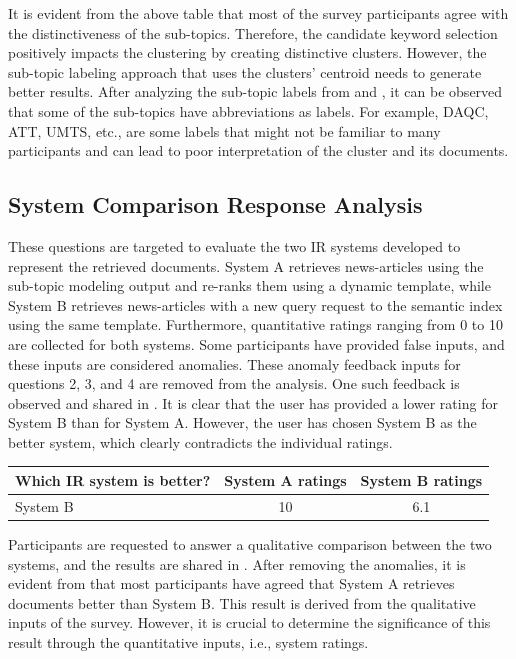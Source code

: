 It is evident from the above table that most of the survey participants agree with the distinctiveness of the sub-topics. Therefore, the candidate keyword selection positively impacts the clustering by creating distinctive clusters. However, the sub-topic labeling approach that uses the clusters' centroid needs to generate better results. After analyzing the sub-topic labels from  and , it can be observed that some of the sub-topics have abbreviations as labels. For example, DAQC, ATT, UMTS, etc., are some labels that might not be familiar to many participants and can lead to poor interpretation of the cluster and its documents.

\subsection{System Comparison Response Analysis}

These questions are targeted to evaluate the two IR systems developed to represent the retrieved documents. System A retrieves news-articles using the sub-topic modeling output and re-ranks them using a dynamic template, while System B retrieves news-articles with a new query request to the semantic index using the same template. Furthermore, quantitative ratings ranging from 0 to 10 are collected for both systems. Some participants have provided false inputs, and these inputs are considered anomalies. These anomaly feedback inputs for questions 2, 3, and 4 are removed from the analysis. One such feedback is observed and shared in . It is clear that the user has provided a lower rating for System B than for System A. However, the user has chosen System B as the better system, which clearly contradicts the individual ratings.


 \begin{center}
	\label{tab:question_234_anamoly}
	\begin{tabularx}{.8\textwidth}{|Y|c|c|}
		\hline
		Which IR system is better? & System A ratings & System B ratings \\
		\hline
		\ac{System B} & 10 & 6.1 \\
		\hline
	\end{tabularx}
\end{center} 

Participants are requested to answer a qualitative comparison between the two systems, and the results are shared in . After removing the anomalies, it is evident from  that most participants have agreed that System A retrieves documents better than System B. This result is derived from the qualitative inputs of the survey. However, it is crucial to determine the significance of this result through the quantitative inputs, i.e., system ratings.

